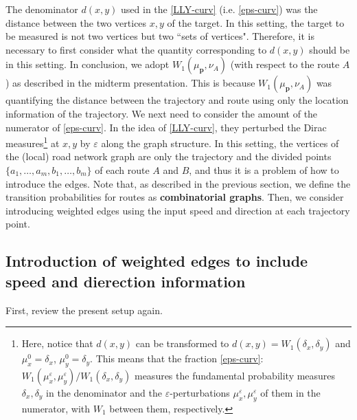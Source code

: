 \documentclass{article}
\numberwithin{equation}{section}
\theoremstyle{definition}
\newcommand{\dex}{\delta_x}
\newcommand{\dey}{\delta_y}
\newcommand{\eps}{\varepsilon} %
\begin{document}
The denominator $d(x,y)$ used in the \autoref{LLY-curv} (i.e. \autoref{eps-curv}) was the distance between the two vertices $x,y$ of the target.
In this setting, the target to be measured is not two vertices but two ``sets of vertices".
Therefore, it is necessary to first consider what the quantity corresponding to $d(x,y)$ should be in this setting.
In conclusion, we adopt $W_1(\mu_\mathbf{p}, \nu_A)$ (with respect to the route $A$) as described in the midterm presentation.
This is because $W_1(\mu_\mathbf{p}, \nu_A)$ was quantifying the distance between the trajectory and route using only the location information of the trajectory.
We next need to consider the amount of the numerator of \autoref{eps-curv}.
In the idea of \autoref{LLY-curv}, they perturbed the Dirac measures\footnote{
Here, notice that $d(x,y)$ can be transformed to $d(x,y)=W_1(\dex,\dey)$ and $\mu_x^0=\dex$, $\mu_y^0=\dey$.
This means that the fraction \autoref{eps-curv}: $W_1(\mu_x^\eps,\mu_y^\eps)/W_1(\dex,\dey)$ measures the fundamental probability measures $\dex,\dey$ in the denominator and the $\eps$-perturbations $\mu_x^\eps,\mu_y^\eps$ of them in the numerator, with $W_1$ between them, respectively.}
at $x,y$ by $\eps$ along the graph structure.
In this setting, the vertices of the (local) road network graph are only the trajectory and the divided points $\{a_1,\ldots,a_m,b_1,\dots,b_m\}$ of each route $A$ and $B$, and thus it is a problem of how to introduce the edges.
Note that, as described in the previous section, we define the transition probabilities for routes as \textbf{combinatorial graphs}.
Then, we consider introducing weighted edges using the input speed and direction at each trajectory point.

\subsection*{Introduction of weighted edges to include speed and dierection information}

First, review the present setup again.
\end{document}

